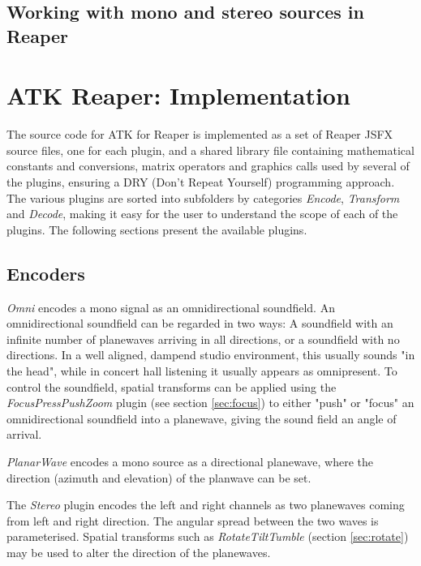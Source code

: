\documentclass{article}
\begin{document}
\subsection{Working with mono and stereo sources in Reaper}


\section{ATK Reaper: Implementation}\label{sec:implementation}

The source code for ATK for Reaper is implemented as a set of Reaper JSFX source files, one for each plugin, and a shared library file containing mathematical constants and conversions, matrix operators and graphics calls used by several of the plugins, ensuring a DRY (Don't Repeat Yourself) programming approach.
The various plugins are sorted into subfolders by categories \emph{Encode}, \emph{Transform} and \emph{Decode}, making it easy for the user to understand the scope of each of the plugins. 
The following sections present the available plugins.


\subsection{Encoders}\label{sec:encoders}

\emph{Omni} encodes a mono signal as an omnidirectional soundfield.
An omnidirectional soundfield can be regarded in two ways:
A soundfield with an infinite number of plane\-waves arriving in all directions, or a soundfield with no directions. In a well aligned, dampend studio environment, this usually sounds "in the head", while in concert hall listening it usually appears as omnipresent.
To control the soundfield, spatial transforms can be applied using the \emph{FocusPressPushZoom} plugin (see section \ref{sec:focus}) to either "push" or "focus" an omnidirectional soundfield into a plane\-wave, giving the sound field an angle of arrival.

\emph{PlanarWave} encodes a mono source as a directional plane\-wave, where the direction (azimuth and elevation) of the planwave can be set.

The \emph{Stereo} plugin encodes the left and right channels as two planewaves coming from left and right direction. The angular spread between the two waves is parameterised.
Spatial transforms such as \emph{RotateTiltTumble} (section \ref{sec:rotate}) may be used to alter the direction of the planewaves.
\end{document}
